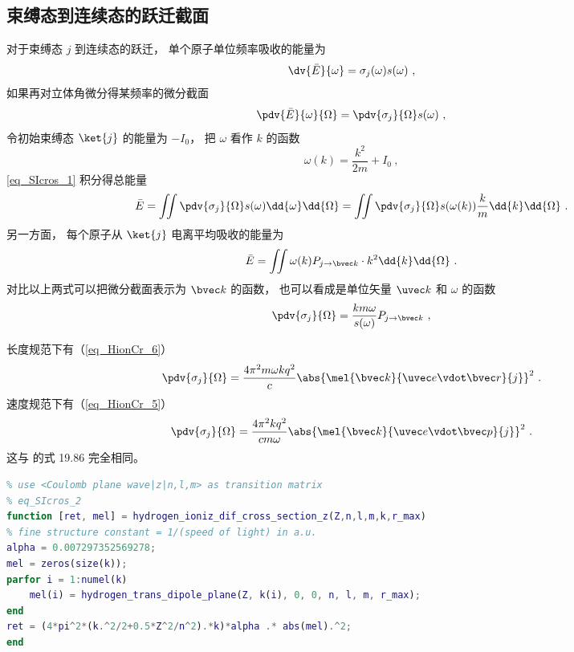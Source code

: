 \subsection{束缚态到连续态的跃迁截面}
对于束缚态 $j$ 到连续态的跃迁， 单个原子单位频率吸收的能量为
\begin{equation}
\dv{\bar E}{\omega} = \sigma_j(\omega) s(\omega)~,
\end{equation}
如果再对立体角微分得某频率的微分截面 %
\begin{equation}\label{eq_SIcros_1}
\pdv{\bar E}{\omega}{\Omega} = \pdv{\sigma_j}{\Omega} s(\omega)~,
\end{equation}
令初始束缚态 $\ket{j}$ 的能量为 $-I_0$， 把 $\omega$ 看作 $k$ 的函数
\begin{equation}
\omega(k) = \frac{k^2}{2m} + I_0~,
\end{equation}
\autoref{eq_SIcros_1} 积分得总能量
\begin{equation}
\bar E = \iint \pdv{\sigma_j}{\Omega} s(\omega) \dd{\omega}\dd{\Omega} = \iint \pdv{\sigma_j}{\Omega} s(\omega(k)) \frac{k}{m}\dd{k}\dd{\Omega}~.
\end{equation}
另一方面， 每个原子从 $\ket{j}$ 电离平均吸收的能量为
\begin{equation}
\bar E = \iint \omega(k) P_{j\to {\bvec k}} \cdot k^2 \dd{k}\dd{\Omega}~.
\end{equation}
对比以上两式可以把微分截面表示为 $\bvec k$ 的函数， 也可以看成是单位矢量 $\uvec k$ 和 $\omega$ 的函数
\begin{equation}
\pdv{\sigma_j}{\Omega} = \frac{km \omega}{s(\omega)} P_{j\to \bvec k}~,
\end{equation}

长度规范下有（\autoref{eq_HionCr_6}）
\begin{equation}\label{eq_SIcros_2}
\pdv{\sigma_j}{\Omega} = \frac{4\pi^2 m\omega k q^2}{c} \abs{\mel{\bvec k}{\uvec e \vdot\bvec r}{j}}^2~.
\end{equation}
速度规范下有（\autoref{eq_HionCr_5}）
\begin{equation}\label{eq_SIcros_8}
\pdv{\sigma_j}{\Omega} = \frac{4\pi^2 k q^2}{c m \omega} \abs{\mel{\bvec k}{\uvec e \vdot \bvec p}{j}}^2~.
\end{equation}
这与 \cite{Merzbacher} 的式 19.86 完全相同。

\begin{lstlisting}[language=matlab, caption=hydrogen\_ioniz\_dif\_cross\_section\_z.m]
% hydrogen single ionization differential cross section
% use <Coulomb plane wave|z|n,l,m> as transition matrix
% eq_SIcros_2
function [ret, mel] = hydrogen_ioniz_dif_cross_section_z(Z,n,l,m,k,r_max)
% fine structure constant = 1/(speed of light) in a.u.
alpha = 0.007297352569278;
mel = zeros(size(k));
parfor i = 1:numel(k)
    mel(i) = hydrogen_trans_dipole_plane(Z, k(i), 0, 0, n, l, m, r_max);
end
ret = (4*pi^2*(k.^2/2+0.5*Z^2/n^2).*k)*alpha .* abs(mel).^2;
end
\end{lstlisting}

